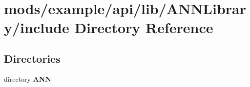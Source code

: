 \section{mods/example/api/lib/\+A\+N\+N\+Library/include Directory Reference}
\label{dir_cf7146bb7768082b3bc9ac6d1de63e2a}
\subsection*{Directories}
\begin{DoxyCompactItemize}
\item 
directory {\bf A\+N\+N}
\end{DoxyCompactItemize}
